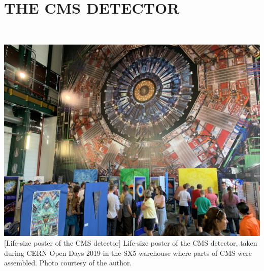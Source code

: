 \chapter{THE CMS DETECTOR} 
\label{ch:cms}
\textcolor{white}{words}  %
\begin{multiFigure}
    \centering
    \includegraphics[height=10cm]{figures/cms/cms_poster_SX5.jpg}
        [Life-size poster of the CMS detector]
        {Life-size poster of the CMS detector, taken during CERN Open Days 2019 in the SX5 warehouse where parts of CMS were assembled.
        Photo courtesy of the author.}
    \label{fig:cms_poster}
\end{multiFigure}

